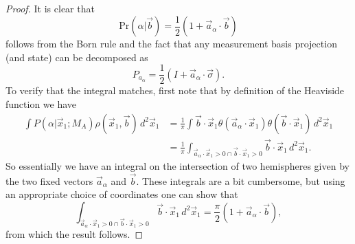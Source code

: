 \documentclass[12pt,draft]{article}
\theoremstyle{definition}
\theoremstyle{plain}
\begin{document}
    {\color{blue}
        \begin{proof}
            It is clear that
            \begin{equation}
                \text{Pr}(\alpha | \vec b)
                = \frac{1}{2} \left( 
                    1 + \vec a_\alpha \cdot \vec b
                \right) 
            \end{equation}
            follows from the Born rule and the fact that any
            measurement basis projection (and state) can be
            decomposed as
            \begin{equation}
                P_{a_\alpha}
                = \frac{1}{2} \left( I + \vec a_\alpha \cdot
                \vec \sigma \right).
            \end{equation}
            To verify that the integral matches, first note
            that by definition of the Heaviside function we
            have
            \begin{align}
                \int P(\alpha | \vec x_1; M_A)
                \rho(\vec x_1, \vec b) \, d^2 \vec x_1 
                &= \frac{1}{\pi} \int \vec b \cdot \vec x_1 
                \theta(\vec a_\alpha \cdot \vec x_1)
                \theta(\vec b \cdot \vec x_1) \, d^2 \vec
                x_1 \\
                &=  \frac{1}{\pi} \int_{\vec a_\alpha \cdot
                \vec x_1 > 0 \cap \vec b \cdot \vec x_1 > 0}
                \vec b \cdot \vec x_1 \, d^2 \vec x_1.
            \end{align}
            So essentially we have an integral on the
            intersection of two hemispheres given by the two
            fixed vectors $\vec a_\alpha$ and $\vec b$.
            These integrals are a bit cumbersome, but using
            an appropriate choice of coordinates one can
            show that
            \begin{equation}
                \int_{\vec a_\alpha \cdot
                \vec x_1 > 0 \cap \vec b \cdot \vec x_1 > 0}
                \vec b \cdot \vec x_1 \, d^2 \vec x_1
                = \frac{\pi}{2}(1 + \vec a_\alpha \cdot \vec
                b),
            \end{equation}
            from which the result follows.
        \end{proof}
    }
\end{document}
